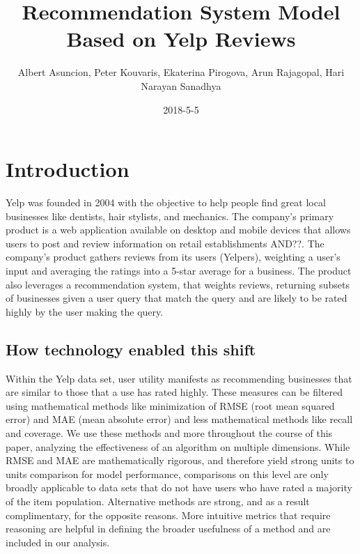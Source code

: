 \documentclass{article}
\title{Recommendation System Model Based on Yelp Reviews}
\date{2018-5-5}
\author{Albert Asuncion, Peter Kouvaris, Ekaterina Pirogova, Arun Rajagopal, Hari Narayan Sanadhya}
\begin{document}
\maketitle
{}
\newpage
{}

\section{Introduction}
Yelp was founded in 2004 with the objective to help people find great local businesses like dentists, hair stylists, and mechanics. The company's primary product is a web application available on desktop and mobile devices that allows users to post and review information on retail establishments AND??. The company's product gathers reviews from its users (Yelpers), weighting a user's input and averaging the ratings into a 5-star average for a business. The product also leverages a recommendation system, that weights reviews, returning subsets of businesses given a user query that match the query and are likely to be rated highly by the user making the query. 

\subsection{How technology enabled this shift}
Within the Yelp data set, user utility manifests as recommending businesses that are similar to those that a use has rated highly. These measures can be filtered using mathematical methods like minimization of RMSE (root mean squared error) and MAE (mean absolute error) and less mathematical methods like recall and coverage. We use these methods and more throughout the course of this paper, analyzing the effectiveness of an algorithm on multiple dimensions. While RMSE and MAE are mathematically rigorous, and therefore yield strong units to units comparison for model performance, comparisons on this level are only broadly applicable to data sets that do not have users who have rated a majority of the item population. Alternative methods are strong, and as a result complimentary, for the opposite reasons. More intuitive metrics that require reasoning are helpful in defining the broader usefulness of a method and are included in our analysis. 
\end{document}
